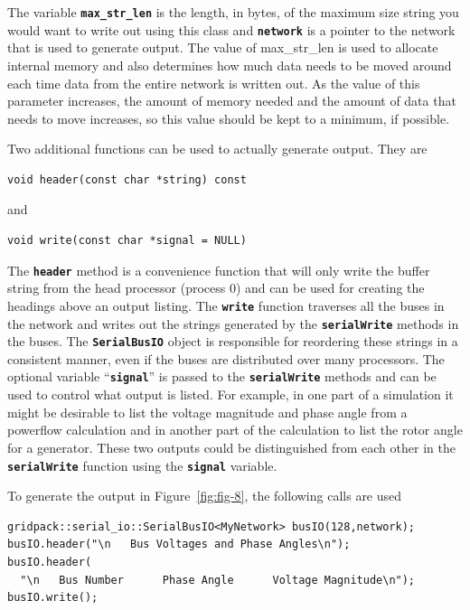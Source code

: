 \documentclass[12pt]{report} %
\begin{document}
The variable \texttt{\textbf{max\_str\_len}} is the length, in bytes, of the maximum size string you would want to write out using this class and \texttt{\textbf{network}} is a pointer to the network that is used to generate output. The value of max\_str\_len is used to allocate internal memory and also determines how much data needs to be moved around each time data from the entire network is written out. As the value of this parameter increases, the amount of memory needed and the amount of data that needs to move increases, so this value should be kept to a minimum, if possible. 

Two additional functions can be used to actually generate output. They are

{
\color{red}
\begin{Verbatim}[fontseries=b]
void header(const char *string) const
\end{Verbatim}
}

and 

{
\color{red}
\begin{Verbatim}[fontseries=b]
void write(const char *signal = NULL)
\end{Verbatim}
}

The \texttt{\textbf{header}} method is a convenience function that will only write the buffer string from the head processor (process 0) and can be used for creating the headings above an output listing. The \texttt{\textbf{write}} function traverses all the buses in the network and writes out the strings generated by the \texttt{\textbf{serialWrite}} methods in the buses. The \texttt{\textbf{SerialBusIO}} object is responsible for reordering these strings in a consistent manner, even if the buses are distributed over many processors. The optional variable ``\texttt{\textbf{signal}}'' is passed to the \texttt{\textbf{serialWrite}} methods and can be used to control what output is listed. For example, in one part of a simulation it might be desirable to list the voltage magnitude and phase angle from a powerflow calculation and in another part of the calculation to list the rotor angle for a generator. These two outputs could be distinguished from each other in the \texttt{\textbf{serialWrite}} function using the \texttt{\textbf{signal}} variable.

To generate the output in Figure~\ref{fig:fig-8}, the following calls are used

{
\color{red}
\begin{Verbatim}[fontseries=b]
gridpack::serial_io::SerialBusIO<MyNetwork> busIO(128,network);
busIO.header("\n   Bus Voltages and Phase Angles\n");
busIO.header(
  "\n   Bus Number      Phase Angle      Voltage Magnitude\n");
busIO.write();
\end{Verbatim}
}
\end{document}
